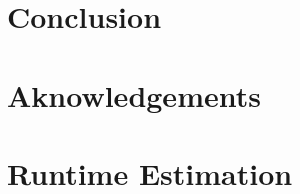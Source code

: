 \documentclass[a4paper, 12pt,oneside]{article}
\begin{document}
	\section{Conclusion}
	\section*{Aknowledgements}
	\appendix
		\section{Runtime Estimation}\label{appendix:runtime_estimation}
\end{document}
